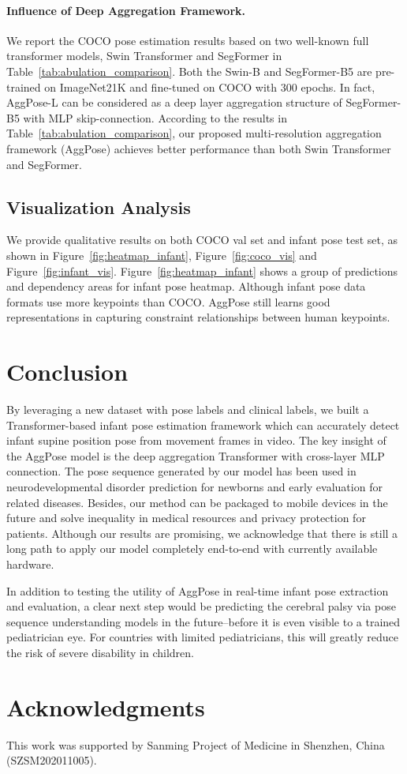 \documentclass{article}
\begin{document}
\paragraph{Influence of Deep Aggregation Framework.} We report the COCO pose estimation results based on two well-known full transformer models, Swin Transformer and SegFormer in Table~\ref{tab:abulation_comparison}. Both the Swin-B and SegFormer-B5 are pre-trained on ImageNet21K and fine-tuned on COCO with 300 epochs. In fact, AggPose-L can be considered as a deep layer aggregation structure of SegFormer-B5 with MLP skip-connection. According to the results in Table~\ref{tab:abulation_comparison}, our proposed multi-resolution aggregation framework (AggPose) achieves better performance than both Swin Transformer and SegFormer. 


\subsection{Visualization Analysis}
We provide qualitative results on both COCO val set and infant pose test set, as shown in Figure~\ref{fig:heatmap_infant}, Figure~\ref{fig:coco_vis} and Figure~\ref{fig:infant_vis}. Figure~\ref{fig:heatmap_infant} shows a group of predictions and dependency areas for infant pose heatmap. Although infant pose data formats use more keypoints than COCO. AggPose still learns good representations in capturing constraint relationships between human keypoints.

\section{Conclusion}
By leveraging a new dataset with pose labels and clinical labels, we built a Transformer-based infant pose estimation framework which can accurately detect infant supine position pose from movement frames in video. The key insight of the AggPose model is the deep aggregation Transformer with cross-layer MLP connection. The pose sequence generated by our model has been used in neurodevelopmental disorder prediction for newborns and early evaluation for related diseases. Besides, our method can be packaged to mobile devices in the future and solve inequality in medical resources and privacy protection for patients. Although our results are promising, we acknowledge that there is still a long path to apply our model completely end-to-end with currently available hardware.

In addition to testing the utility of AggPose in real-time infant pose extraction and evaluation, a clear next step would be predicting the cerebral palsy via pose sequence understanding models in the future–before it is even visible to a trained pediatrician eye. For countries with limited pediatricians, this will greatly reduce the risk of severe disability in children.

\section*{Acknowledgments}

This work was supported by Sanming Project of Medicine in Shenzhen, China (SZSM202011005).



















\end{document}
